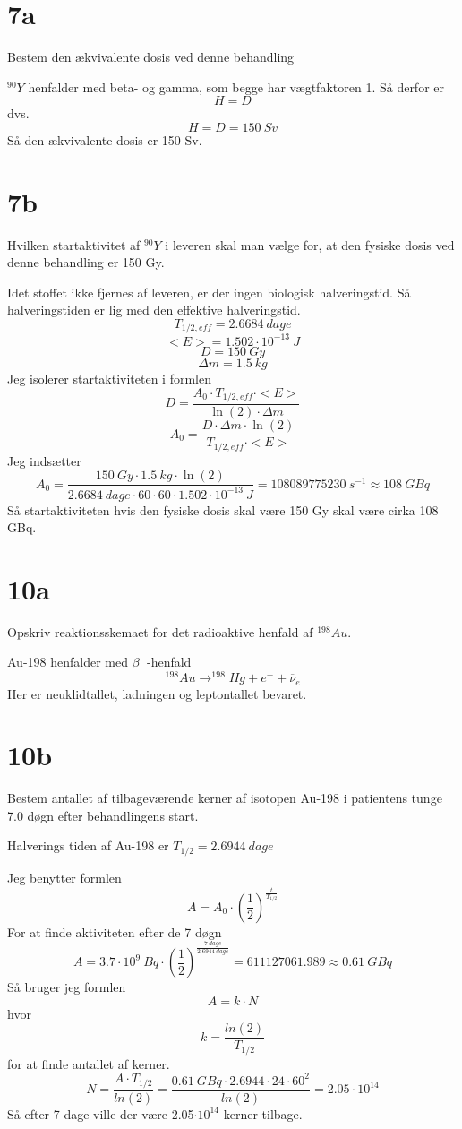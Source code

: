 \documentclass[12pt]{article}
\begin{document}
\section*{7a}

Bestem den ækvivalente dosis ved denne behandling

$^{90}Y$ henfalder med beta- og gamma, som begge har vægtfaktoren 1. Så derfor er
$$H=D$$
dvs.
$$H=D=150\ Sv$$
Så den ækvivalente dosis er 150 Sv.

\section*{7b}

Hvilken startaktivitet af $^{90}Y$ i leveren skal man vælge for, at den fysiske dosis ved denne behandling er 150 Gy.

Idet stoffet ikke fjernes af leveren, er der ingen biologisk halveringstid. Så halveringstiden er lig med den effektive halveringstid.
$$T_{1/2,eff}=2.6684\ dage$$
$$<E> = 1.502\cdot 10^{-13}\ J$$
$$D=150\ Gy$$
$$\Delta m=1.5\ kg$$
Jeg isolerer startaktiviteten i formlen
$$D=\frac{A_0\cdot T_{1/2,eff}\cdot <E>}{\ln(2)\cdot \Delta m}$$
$$A_0=\frac{D\cdot \Delta m\cdot \ln(2)}{T_{1/2,eff}\cdot <E>}$$
Jeg indsætter
$$A_0=\frac{150\ Gy\cdot 1.5\ kg\cdot \ln(2)}{2.6684\ dage\cdot 60\cdot 60\cdot 1.502\cdot 10^{-13}\ J}=108089775230\ s^{-1} \approx 108\ GBq$$
Så startaktiviteten hvis den fysiske dosis skal være 150 Gy skal være cirka 108 GBq.

\section*{10a}

Opskriv reaktionsskemaet for det radioaktive henfald af $^{198}Au$.

Au-198 henfalder med $\beta^-$-henfald
$$^{198}Au \rightarrow ^{198}Hg + e^- + \overline{\nu}_e$$
Her er neuklidtallet, ladningen og leptontallet bevaret.

\section*{10b}

Bestem antallet af tilbageværende kerner af isotopen Au-198 i patientens tunge 7.0 døgn efter behandlingens start.

Halverings tiden af Au-198 er $T_{1/2} = 2.6944\ dage$

Jeg benytter formlen
$$A = A_0\cdot \left( \frac{1}{2} \right) ^{\frac{t}{T_{1/2}}}$$
For at finde aktiviteten efter de 7 døgn
$$A = 3.7\cdot 10^9\ Bq\cdot \left( \frac{1}{2} \right) ^{\frac{7\ dage}{2.6944\ dage}} = 611127061.989 \approx 0.61\ GBq$$
Så bruger jeg formlen
$$A = k\cdot N$$
hvor
$$k = \frac{ln(2)}{T_{1/2}}$$
for at finde antallet af kerner.
$$N = \frac{A\cdot T_{1/2}}{ln(2)} = \frac{0.61\ GBq\cdot 2.6944\cdot 24\cdot 60^2}{ln(2)} = 2.05\cdot 10^{14}$$
Så efter 7 dage ville der være 2.05$\cdot 10^{14}$ kerner tilbage.
\end{document}
